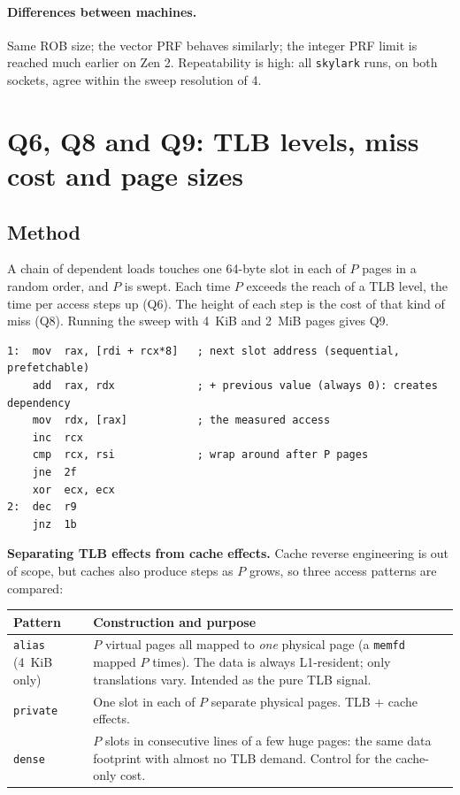 \documentclass[11pt]{article}
\newcommand{\sk}{\texttt{skylark}}
\newcommand{\file}[1]{\texttt{\detokenize{#1}}}
\begin{document}
\paragraph{Differences between machines.} Same ROB size; the vector PRF
behaves similarly; the integer PRF limit is reached much earlier on Zen 2.
Repeatability is high: all \sk{} runs, on both sockets, agree within the
sweep resolution of 4.

\section{Q6, Q8 and Q9: TLB levels, miss cost and page sizes}
\label{sec:tlb}

\subsection{Method}

A chain of dependent loads touches one 64-byte slot in each of $P$ pages in
a random order, and $P$ is swept. Each time $P$ exceeds the reach of a TLB
level, the time per access steps up (Q6). The height of each step is the
cost of that kind of miss (Q8). Running the sweep with 4~KiB and 2~MiB pages
gives Q9.

\begin{lstlisting}[language={[x86masm]Assembler},caption={Timed loop (\file{exp/tlb/tlb_chase.S}). Each load's address depends on the previous load's value, so accesses are serialized and the time per access is load latency plus any TLB-miss penalty.}]
1:  mov  rax, [rdi + rcx*8]   ; next slot address (sequential, prefetchable)
    add  rax, rdx             ; + previous value (always 0): creates dependency
    mov  rdx, [rax]           ; the measured access
    inc  rcx
    cmp  rcx, rsi             ; wrap around after P pages
    jne  2f
    xor  ecx, ecx
2:  dec  r9
    jnz  1b
\end{lstlisting}

\textbf{Separating TLB effects from cache effects.} Cache reverse engineering
is out of scope, but caches also produce steps as $P$ grows, so three access
patterns are compared:

\begin{center}
\small
\begin{tabularx}{\linewidth}{@{}lX@{}}
\toprule
Pattern & Construction and purpose \\
\midrule
\texttt{alias} (4~KiB only) & $P$ virtual pages all mapped to \emph{one} physical page (a \texttt{memfd} mapped $P$ times). The data is always L1-resident; only translations vary. Intended as the pure TLB signal. \\
\texttt{private} & One slot in each of $P$ separate physical pages. TLB + cache effects. \\
\texttt{dense} & $P$ slots in consecutive lines of a few huge pages: the same data footprint with almost no TLB demand. Control for the cache-only cost. \\
\bottomrule
\end{tabularx}
\end{center}
\end{document}
